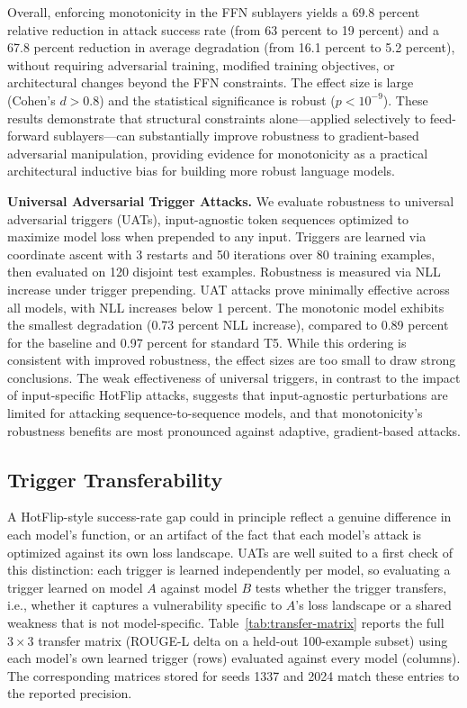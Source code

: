 \documentclass{article}
\theoremstyle{plain}
\theoremstyle{definition}
\theoremstyle{remark}
\begin{document}
Overall, enforcing monotonicity in the FFN sublayers yields a 69.8 percent relative reduction in attack success rate (from 63 percent to 19 percent) and a 67.8 percent reduction in average degradation (from 16.1 percent to 5.2 percent), without requiring adversarial training, modified training objectives, or architectural changes beyond the FFN constraints. The effect size is large (Cohen's $d > 0.8$) and the statistical significance is robust ($p < 10^{-9}$). These results demonstrate that structural constraints alone—applied selectively to feed-forward sublayers—can substantially improve robustness to gradient-based adversarial manipulation, providing evidence for monotonicity as a practical architectural inductive bias for building more robust language models.

\textbf{Universal Adversarial Trigger Attacks.}
We evaluate robustness to universal adversarial triggers (UATs), input-agnostic token sequences optimized to maximize model loss when prepended to any input. Triggers are learned via coordinate ascent with 3 restarts and 50 iterations over 80 training examples, then evaluated on 120 disjoint test examples. Robustness is measured via NLL increase under trigger prepending. UAT attacks prove minimally effective across all models, with NLL increases below 1 percent. The monotonic model exhibits the smallest degradation (0.73 percent NLL increase), compared to 0.89 percent for the baseline and 0.97 percent for standard T5. While this ordering is consistent with improved robustness, the effect sizes are too small to draw strong conclusions. The weak effectiveness of universal triggers, in contrast to the impact of input-specific HotFlip attacks, suggests that input-agnostic perturbations are limited for attacking sequence-to-sequence models, and that monotonicity’s robustness benefits are most pronounced against adaptive, gradient-based attacks.

\subsection{Trigger Transferability}
\label{sec:transfer-matrix}
A HotFlip-style success-rate gap could in principle reflect a genuine difference in each model's function, or an artifact of the fact that each model's attack is optimized against its own loss landscape. UATs are well suited to a first check of this distinction: each trigger is learned independently per model, so evaluating a trigger learned on model $A$ against model $B$ tests whether the trigger transfers, i.e., whether it captures a vulnerability specific to $A$'s loss landscape or a shared weakness that is not model-specific. Table~\ref{tab:transfer-matrix} reports the full $3\times3$ transfer matrix (ROUGE-L delta on a held-out 100-example subset) using each model's own learned trigger (rows) evaluated against every model (columns). The corresponding matrices stored for seeds 1337 and 2024 match these entries to the reported precision.
\end{document}
